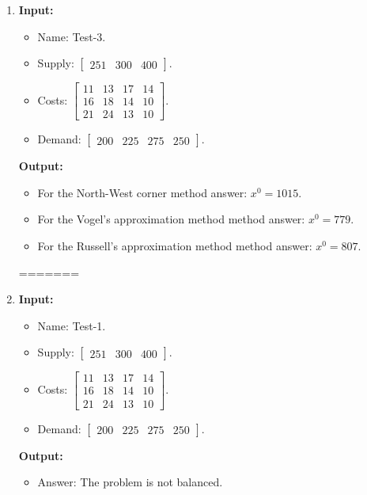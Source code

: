 \documentclass{article}
\begin{document}
\begin{enumerate}[label={(\arabic*)}, itemsep=0.25in]
\item \textbf{Input:}
\begin{itemize}
\item Name: Test-3.
\item Supply: \(\begin{bmatrix} 251 & 300 & 400 \end{bmatrix}\).
\item Costs: \(\begin{bmatrix}
11 & 13 & 17 & 14 \\
16 & 18 & 14 & 10 \\
21 & 24 & 13 & 10
\end{bmatrix}\).
\item Demand: \(\begin{bmatrix} 200 & 225 & 275 & 250 \end{bmatrix}\).
\end{itemize}
\textbf{Output:}
\begin{itemize}
\item For the North-West corner method answer: \(x^0 = 1015\).
\item For the Vogel’s approximation method method answer: \(x^0 = 779\).
\item For the Russell’s approximation method method answer: \(x^0 = 807\).
\end{itemize}
=======
    \item \textbf{Input:}
          \begin{itemize}
              \item Name: Test-1.
              \item Supply: \(\begin{bmatrix} 251 & 300 & 400 \end{bmatrix}\).
              \item Costs: \(\begin{bmatrix}
                        11 & 13 & 17 & 14 \\
                        16 & 18 & 14 & 10 \\
                        21 & 24 & 13 & 10
                    \end{bmatrix}\).
              \item Demand: \(\begin{bmatrix} 200 & 225 & 275 & 250 \end{bmatrix}\).
          \end{itemize}
          \textbf{Output:}
          \begin{itemize}
              \item Answer: The problem is not balanced.
          \end{itemize}


\end{enumerate}
\end{document}
